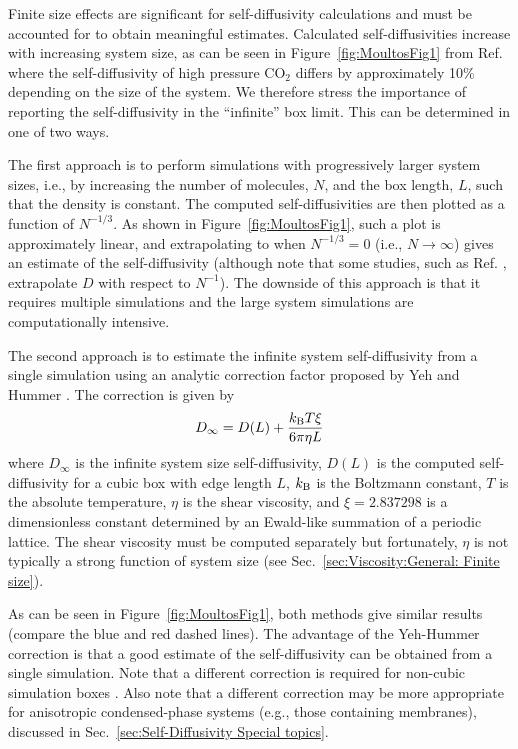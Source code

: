 \documentclass[9pt,bestpractices]{livecoms}
\begin{document}
Finite size effects are significant for self-diffusivity calculations and must be accounted for to obtain meaningful estimates. Calculated self-diffusivities increase with increasing system size, as can be seen in Figure~\ref{fig:MoultosFig1} from Ref. \cite{Moultos2016} where the self-diffusivity of high pressure CO$_2$ differs by approximately 10\% depending on the size of the system. We therefore stress the importance of reporting the self-diffusivity in the ``infinite'' box limit. This can be determined in one of two ways. 

The first approach is to perform simulations with progressively larger system sizes, i.e., by increasing the number of molecules, $N$, and the box length, $L$, such that the density is constant. The computed self-diffusivities are then plotted as a function of $N^{-1/3}$. As shown in Figure~\ref{fig:MoultosFig1}, such a plot is approximately linear, and extrapolating to when $N^{-1/3}=0$ (i.e., $N \rightarrow \infty$) gives an estimate of the self-diffusivity (although note that some studies, such as Ref. \cite{Daivis:1995}, extrapolate $D$ with respect to $N^{-1}$). The downside of this approach is that it requires multiple simulations and the large system simulations are computationally intensive. 

The second approach is to estimate the infinite system self-diffusivity from a single simulation using an analytic correction factor proposed by Yeh and Hummer \cite{Yeh2004}. The correction is given by
\begin{equation}
	D_{\infty} = D(L) + \frac{k_{\rm B} T \xi}{6 \pi \eta L}
	\label{eq:YH-correction}
\end{equation}
where $D_\infty$ is the infinite system size self-diffusivity, $D(L)$ is the computed self-diffusivity for a cubic box with edge length $L$, $k_{\rm B}$ is the Boltzmann constant,
$T$ is the absolute temperature, $\eta$ is the shear viscosity, and $\xi = 2.837298$ is a dimensionless constant determined by an Ewald-like summation of a periodic lattice. The shear viscosity must be computed separately but fortunately, $\eta$ is not typically a strong function of system size (see Sec.\ \ref{sec:Viscosity:General: Finite size}). 

As can be seen in Figure~\ref{fig:MoultosFig1}, both methods give similar results (compare the blue and red dashed lines). The advantage of the Yeh-Hummer correction is that a good estimate of the self-diffusivity can be obtained from a single simulation. Note that a different correction is required for non-cubic simulation boxes \cite{Kikugawa:2015}. Also note that a different correction may be more appropriate for anisotropic condensed-phase systems (e.g., those containing membranes), discussed in Sec.\ \ref{sec:Self-Diffusivity Special topics}.
\end{document}
